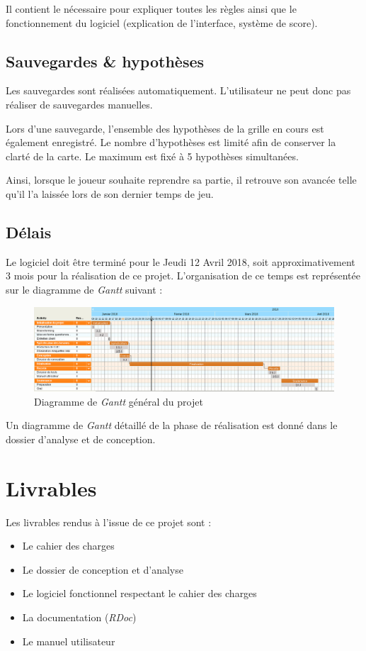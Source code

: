 \documentclass[a4paper, 12pt]{report}
\begin{document}
		Il contient le nécessaire pour expliquer toutes les règles ainsi que le fonctionnement du logiciel (explication de l'interface, système de score).


	\section{Sauvegardes \& hypothèses}
	
		Les sauvegardes sont réalisées automatiquement. L'utilisateur ne peut donc pas réaliser de sauvegardes manuelles. 
		
		Lors d'une sauvegarde, l'ensemble des hypothèses de la grille en cours est également enregistré. Le nombre d'hypothèses est limité afin de conserver la clarté de la carte. Le maximum est fixé à 5 hypothèses simultanées.
		
		Ainsi, lorsque le joueur souhaite reprendre sa partie, il retrouve son avancée telle qu'il l'a laissée lors de son dernier temps de jeu.
	
	\section{Délais}
	
		Le logiciel doit être terminé pour le Jeudi 12 Avril 2018, soit approximativement 3 mois pour la réalisation de ce projet. L'organisation de ce temps est représentée sur le diagramme de \textit{Gantt} suivant :

	\begin{figure}[H]
		\centering
		\caption{Diagramme de \textit{Gantt} général du projet}
		\includegraphics[width=17cm]{ganttGeneral.png}
	\end{figure}	     
		
		Un diagramme de \textit{Gantt} détaillé de la phase de réalisation est donné dans le dossier d'analyse et de conception.

		
\chapter{Livrables}
\vspace*{0.5cm}
	Les livrables rendus à l'issue de ce projet sont :
	\begin{itemize}
	\item Le cahier des charges
	\item Le dossier de conception et d'analyse
	\item Le logiciel fonctionnel respectant le cahier des charges
	\item La documentation (\textit{RDoc})
	\item Le manuel utilisateur
	\end{itemize}
		
		
		
\end{document}

